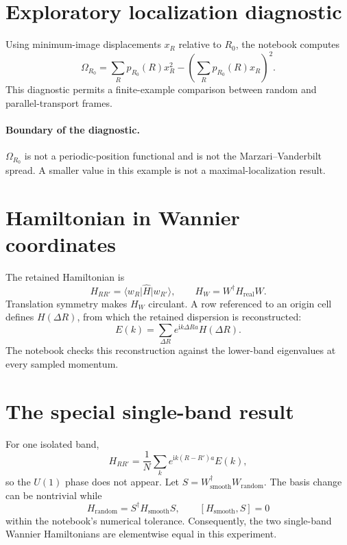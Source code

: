\documentclass[11pt]{article}
\newcommand{\ii}{\mathrm i}
\newcommand{\ket}[1]{\lvert #1\rangle}
\newcommand{\bra}[1]{\langle #1\rvert}
\begin{document}
\section{Exploratory localization diagnostic}

Using minimum-image displacements $x_R$ relative to $R_0$, the notebook computes
\begin{equation}
 \Omega_{R_0}=\sum_Rp_{R_0}(R)x_R^2
 -\left(\sum_Rp_{R_0}(R)x_R\right)^2.
\end{equation}
This diagnostic permits a finite-example comparison between random and
parallel-transport frames.

\paragraph{Boundary of the diagnostic.}
$\Omega_{R_0}$ is not a periodic-position functional and is not the
Marzari--Vanderbilt spread. A smaller value in this example is not a
maximal-localization result.

\section{Hamiltonian in Wannier coordinates}

The retained Hamiltonian is
\begin{equation}
 H_{RR'}=\bra{w_R}\hat H\ket{w_{R'}},
 \qquad H_W=W^\dagger H_{\mathrm{real}}W.
\end{equation}
Translation symmetry makes $H_W$ circulant. A row referenced to an origin cell
defines $H(\Delta R)$, from which the retained dispersion is reconstructed:
\begin{equation}
 E(k)=\sum_{\Delta R}e^{\ii k\Delta Ra}H(\Delta R).
\end{equation}
The notebook checks this reconstruction against the lower-band eigenvalues at
every sampled momentum.

\section{The special single-band result}

For one isolated band,
\begin{equation}
 H_{RR'}=\frac1N\sum_k e^{\ii k(R-R')a}E(k),
\end{equation}
so the $U(1)$ phase does not appear. Let
$S=W_{\mathrm{smooth}}^\dagger W_{\mathrm{random}}$. The basis change can be
nontrivial while
\begin{equation}
 H_{\mathrm{random}}=S^\dagger H_{\mathrm{smooth}}S,
 \qquad [H_{\mathrm{smooth}},S]=0
\end{equation}
within the notebook's numerical tolerance. Consequently, the two single-band
Wannier Hamiltonians are elementwise equal in this experiment.
\end{document}
